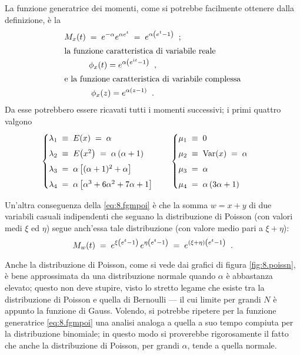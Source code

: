 La funzione generatrice dei momenti, come si potrebbe
facilmente ottenere dalla definizione, \`e la
\begin{gather}
  M_x(t) \; = \; e^{- \alpha} e^{\alpha e^t} \; = \;
  e^{\alpha \left( e^t - 1 \right)} \;\; ;
  \label{eq:8.fgmpoi} \\
  \intertext{la funzione caratteristica di variabile reale}
  \phi_x (t) = e^{\alpha \left( e^{it} - 1
    \right)} \;\; , \notag \\
  \intertext{e la funzione caratteristica di variabile
    complessa}
  \phi_x (z) = e^{\alpha (z - 1)} \;\; .
  \label{eq:8.fcapoi}
\end{gather}
Da esse potrebbero essere ricavati tutti i momenti
successivi; i primi quattro valgono
\begin{align*}
  &\begin{cases}
    \lambda_1 \; \equiv \; E(x) \; = \; \alpha \\[1ex]
    \lambda_2 \; \equiv \; E \bigl( x^2 \bigr) \; = \;
    \alpha \, ( \alpha + 1 ) \\[1ex]
    \lambda_3 \; = \; \alpha \, \bigl[ (\alpha + 1)^2 +
    \alpha \bigr] \\[1ex]
    \lambda_4 \; =  \;\alpha \, \bigl[ \alpha^3 + 6 \alpha^2
    + 7 \alpha + 1 \bigr]
  \end{cases}
  &&\begin{cases}
    \mu_1 \; \equiv \; 0 \\[1ex]
    \mu_2 \; \equiv \; \operatorname{Var}(x) \; = \; \alpha \\[1ex]
    \mu_3 \; = \; \alpha \\[1ex]
    \mu_4 \; = \; \alpha \, ( 3 \alpha + 1 )
  \end{cases}
\end{align*}

Un'altra conseguenza della \eqref{eq:8.fgmpoi} \`e che la
somma $w = x + y$ di due variabili casuali indipendenti che
seguano la distribuzione di Poisson (con valori medi $\xi$
ed $\eta$) segue anch'essa tale distribuzione (con valore
medio pari a $\xi + \eta$):
\begin{equation} \label{eq:8.sumpoi}
  M_w(t) \; = \; e^{ \xi \left( e^t - 1 \right) } \, e^{
    \eta \left( e^t - 1 \right) } \; = \; e^{ (\xi + \eta)
    \left( e^t - 1 \right) } \;\; .
\end{equation}

%
Anche la distribuzione di Poisson, come si vede dai grafici
di figura \ref{fig:8.poissn}, \`e bene approssimata da una
distribuzione normale quando $\alpha$ \`e abbastanza
elevato; questo non deve stupire, visto lo stretto legame
che esiste tra la distribuzione di Poisson e quella di
Bernoulli --- il cui limite per grandi $N$ \`e appunto la
funzione di Gauss.  Volendo, si potrebbe ripetere per la
funzione generatrice \eqref{eq:8.fgmpoi} una analisi analoga
a quella a suo tempo compiuta per la distribuzione
binomiale; in questo modo si proverebbe rigorosamente il
fatto che anche la distribuzione di Poisson, per grandi
$\alpha$, tende a quella normale.

